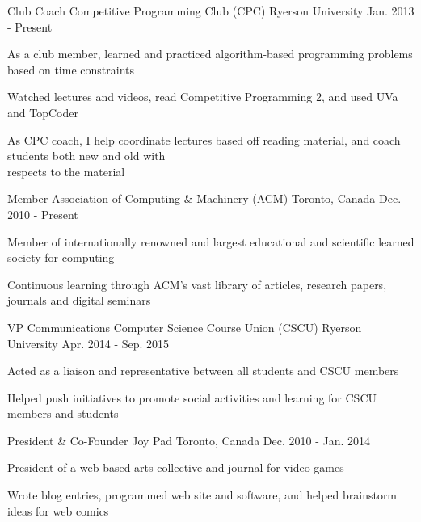 \begin{cventries}
   \cventry
    {Club Coach}
    {Competitive Programming Club (CPC)}
    {Ryerson University}
    {Jan. 2013 - Present}
    {
      \begin{cvitems}
        \item {As a club member, learned and practiced algorithm-based programming problems based on time constraints}
        \item {Watched lectures and videos, read Competitive Programming 2, and used UVa and TopCoder}
        \item {As CPC coach, I help coordinate lectures based off reading material, and coach students both new and old with \\respects to the material}
      \end{cvitems}
    }
   \cventry
    {Member}
    {Association of Computing \& Machinery (ACM)}
    {Toronto, Canada}
    {Dec. 2010 - Present}
    {
      \begin{cvitems}
        \item {Member of internationally renowned and largest educational and scientific learned society for computing}
        \item {Continuous learning through ACM's vast library of articles, research papers, journals and digital seminars}
      \end{cvitems}
    }
  \cventry
    {VP Communications}
    {Computer Science Course Union (CSCU)}
    {Ryerson University}
    {Apr. 2014 - Sep. 2015}
    {
      \begin{cvitems}
        \item {Acted as a liaison and representative between all students and CSCU members}
        \item {Helped push initiatives to promote social activities and learning for CSCU members and students}
      \end{cvitems}
      }
   \cventry
    {President \& Co-Founder}
    {Joy Pad}
    {Toronto, Canada}
    {Dec. 2010 - Jan. 2014}
    {
      \begin{cvitems}
        \item {President of a web-based arts collective and journal for video games}
        \item {Wrote blog entries, programmed web site and software, and helped brainstorm ideas for web comics}
      \end{cvitems}
    }
\end{cventries}